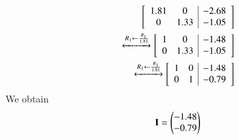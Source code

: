 \documentclass[journal,12pt,twocolumn]{IEEEtran}
\begin{document}
\begin{flushleft}
\begin{align}
\begin{bmatrix}
\begin{array}{cc|c}
1.81 & 0 & -2.68 \\
0 & 1.33 & -1.05\\
\end{array}
\end{bmatrix}\\
\xleftrightarrow[]{R_1\leftarrow \frac{R_1}{1.81}}
\begin{bmatrix}
\begin{array}{cc|c}
1 & 0 & -1.48 \\
0 & 1.33 & -1.05\\
\end{array}
\end{bmatrix}\\
\xleftrightarrow[]{R_1\leftarrow \frac{R_1}{1.81}}
\begin{bmatrix}
\begin{array}{cc|c}
1 & 0 & -1.48 \\
0 & 1 & -0.79\\
\end{array}
\end{bmatrix}
\end{align}
We obtain 
\begin{align}
\mathbf{I}=\begin{pmatrix}-1.48\\-0.79\end{pmatrix}
\end{align}


\end{flushleft}
\end{document}
